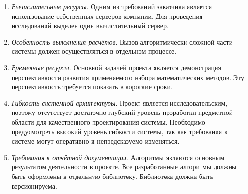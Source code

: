 \begin{enumerate}
    \item {
        \textit{Вычислительные ресурсы}.
        Одним из требований заказчика является использование собственных серверов компании.
        Для проведения исследований выделен один вычислительный сервер.
    }
    \item {
        \textit{Особенность выполнения расчётов}.
        Вызов алгоритмически сложной части системы должен осуществляться в отдельном процессе.
    }
    \item {
        \textit{Временные ресурсы}.
        Основной задачей проекта является демонстрация перспективности развития применяемого набора математических методов.
        Эту перспективность требуется показать в короткие сроки.
    }
    \item {
        \textit{Гибкость системной архитектуры}.
        Проект является исследовательским, поэтому
        отсутствует достаточно глубокий уровень проработки предметной области для качественного проектирования системы.
        Необходимо предусмотреть высокий уровень гибкости системы,
        так как требования к системе могут оперативно и непредсказуемо изменяться.
    }
    \item {
        \textit{Требования к отчётной документации}.
        Алгоритмы являются основным результатом деятельности в проекте.
        Все разработанные алгоритмы должны быть оформлены в отдельную библиотеку.
        Библиотека должна быть версионируема.
    }
\end{enumerate}